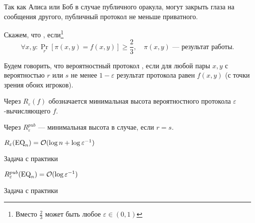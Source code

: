 Так как Алиса или Боб в случае публичного оракула, могут закрыть глаза на сообщения другого, публичный протокол не меньше приватного.

Скажем, что , если\footnote{Вместо $\frac{2}{3}$ может быть любое $\varepsilon \in (0, 1)$ }
\[
	\forall x, y \colon \Pr_{r}[\pi(x, y) = f(x, y)] \ge \frac{2}{3}, \quad \pi(x, y) \text{ --- результат работы}
.\] 
\begin{defn}[]
	Будем говорить, что вероятностный протокол , если для любой пары $ x, y$ с вероятностью  $ r$ или  $ s$ не менее  $ 1 - \varepsilon $ результат протокола равен $ f(x, y)$ (с точки зрения обоих игроков).

	Через  $ R_{ \varepsilon }(f) $ обозначается минимальная высота вероятностного протокола $ \varepsilon $-вычисляющего $ f$. 

	Через $ R_{ \varepsilon }^{pub}$ --- минимальная высота в случае, если $ r = s$.
\end{defn}
\begin{lm}
	$ R_{ \varepsilon } (\operatorname{EQ}_n) = \mathcal{O}( \log n +  \log \varepsilon ^{-1})$
\end{lm}
\begin{proof*}
    Задача с практики
\end{proof*}
\begin{lm}
	$ R^{pub}_{ \varepsilon } (\operatorname{EQ}_n) = \mathcal{O}( \log \varepsilon ^{-1})$
\end{lm}
\begin{proof*}
    Задача с практики
\end{proof*}
